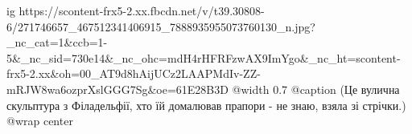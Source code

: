  
 
 
 
 

\ifcmt
  ig https://scontent-frx5-2.xx.fbcdn.net/v/t39.30808-6/271746657_467512341406915_7888935955073760130_n.jpg?_nc_cat=1&ccb=1-5&_nc_sid=730e14&_nc_ohc=mdH4rHFRFzwAX9ImYgo&_nc_ht=scontent-frx5-2.xx&oh=00_AT9d8hAijUCz2LAAPMdIv-ZZ-mRJW8wa6ozprXslGGG7Sg&oe=61E28B3D
	@width 0.7
	@caption (Це вулична скульптура з Філадельфії, хто їй домалював прапори - не знаю, взяла зі стрічки.)
	@wrap center
\fi
